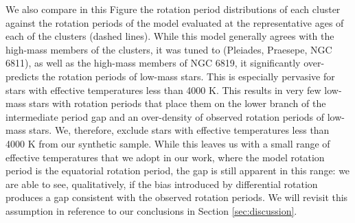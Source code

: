 We also compare in this Figure the rotation period distributions of each cluster against the rotation periods of the \citet{spada_competing_2020} model evaluated at the representative ages of each of the clusters (dashed lines).
While this model generally agrees with the high-mass members of the clusters, it was tuned to (Pleiades, Praesepe, NGC 6811), as well as the high-mass members of NGC 6819, it significantly over-predicts the rotation periods of low-mass stars.
This is especially pervasive for stars with effective temperatures less than 4000 K.
This results in very few low-mass stars with rotation periods that place them on the lower branch of the intermediate period gap and an over-density of observed rotation periods of low-mass stars.
We, therefore, exclude stars with effective temperatures less than 4000 K from our synthetic sample. 
While this leaves us with a small range of effective temperatures that we adopt in our work, where the model rotation period is the equatorial rotation period, the gap is still apparent in this range: we are able to see, qualitatively, if the bias introduced by differential rotation produces a gap consistent with the observed rotation periods.
We will revisit this assumption in reference to our conclusions in Section \ref{sec:discussion}.

